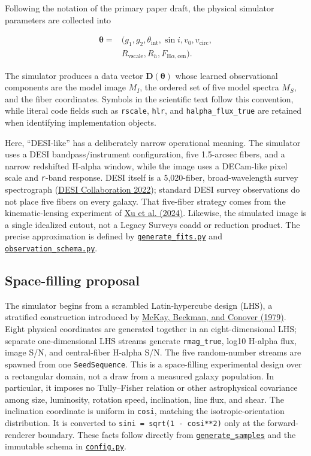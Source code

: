 \documentclass[11pt]{article}
\newcommand{\code}[1]{\nolinkurl{#1}}
\begin{document}
Following the notation of the primary paper draft, the physical simulator
parameters are collected into

\[
\begin{aligned}
\bm{\theta}={}&\bigl(g_1,g_2,\theta_\mathrm{int},\sin i,v_0,v_\mathrm{circ},\\
&R_\mathrm{vscale},R_h,F_{\mathrm{H}\alpha,\mathrm{cen}}\bigr).
\end{aligned}
\]

The simulator produces a data vector
\(\bm{D}(\bm{\theta})\) whose learned observational components are the model
image \(M_I\), the ordered set of five model spectra \(M_S\), and the fiber
coordinates. Symbols in the scientific text follow this convention, while
literal code fields such as \code{rscale}, \code{hlr}, and \code{halpha_flux_true} are retained
when identifying implementation objects.

Here, “DESI-like” has a deliberately narrow operational meaning. The simulator
uses a DESI bandpass/instrument configuration, five 1.5-arcsec fibers, and a
narrow redshifted H-alpha window, while the image uses a DECam-like pixel scale
and \code{r}-band response. DESI itself is a 5,020-fiber, broad-wavelength survey
spectrograph (\hyperlink{ref:desi2022}{DESI Collaboration 2022}); standard DESI survey
observations do not place five fibers on every galaxy. That five-fiber strategy
comes from the kinematic-lensing experiment of \hyperlink{ref:xu2024}{Xu et al. (2024)}.
Likewise, the simulated image is a single idealized cutout, not a Legacy
Surveys coadd or reduction product. The precise approximation is defined by
\href{../data_generate/generate_fits.py}{\code{generate_fits.py}} and
\href{../data_generate/observation_schema.py}{\code{observation_schema.py}}.

\subsection{Space-filling proposal}

The simulator begins from a scrambled Latin-hypercube design (LHS), a
stratified construction introduced by \hyperlink{ref:mckay1979}{McKay, Beckman, and Conover (1979)}. Eight physical coordinates are generated together in an
eight-dimensional LHS; separate one-dimensional LHS streams generate
\code{rmag_true}, log10 H-alpha flux, image S/N, and central-fiber H-alpha S/N. The
five random-number streams are spawned from one \code{SeedSequence}. This is a
space-filling experimental design over a rectangular domain, not a draw from a
measured galaxy population. In particular, it imposes no Tully--Fisher
relation or other astrophysical covariance among size, luminosity, rotation
speed, inclination, line flux, and shear. The inclination coordinate is uniform
in \code{cosi}, matching the isotropic-orientation distribution. It is converted to
\code{sini = sqrt(1 - cosi**2)} only at the forward-renderer boundary. These facts follow directly from
\href{../data_generate/latin_hypercube.py}{\code{generate_samples}} and the immutable
schema in \href{../arch/config.py}{\code{config.py}}.
\end{document}
